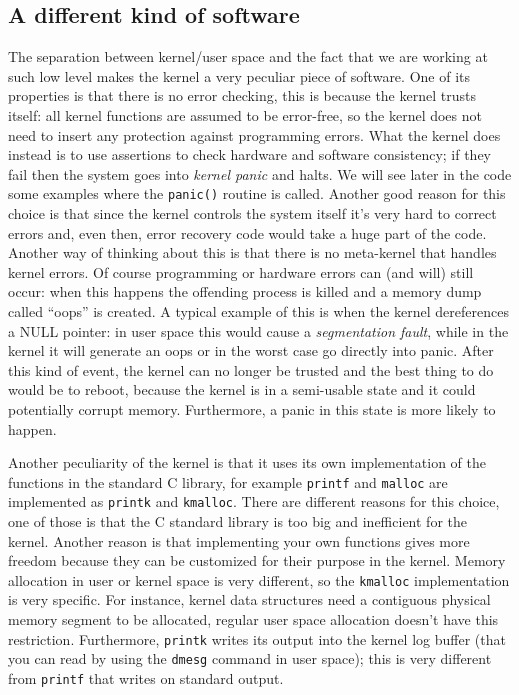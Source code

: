 \documentclass[10pt]{book}
\begin{document}
\subsection{A different kind of software} The separation between kernel/user space and the fact that we are working at such low level makes the kernel a very peculiar piece of software. One of its properties is that there is no error checking, this is because the kernel trusts itself: all kernel functions are assumed to be error-free, so the kernel does not need to insert any protection against programming errors\cite{cesati}. What the kernel does instead is to use assertions to check hardware and software consistency; if they fail then the system goes into \textit{kernel panic} and halts. We will see later in the code some examples where the \verb|panic()| routine is called. Another good reason for this choice is that since the kernel controls the system itself it's very hard to correct errors and, even then, error recovery code would take a huge part of the code. Another way of thinking about this is that there is no meta-kernel that handles kernel errors. Of course programming or hardware errors can (and will) still occur: when this happens the offending process is killed and a memory dump called ``oops'' is created. A typical example of this is when the kernel dereferences a NULL pointer: in user space this would cause a \textit{segmentation fault}, while in the kernel it will generate an oops or in the worst case go directly into panic. After this kind of event, the kernel can no longer be trusted and the best thing to do would be to reboot, because the kernel is in a semi-usable state and it could potentially corrupt memory. Furthermore, a panic in this state is more likely to happen. %

Another peculiarity of the kernel is that it uses its own implementation of the functions in the standard C library, for example \verb|printf| and \verb|malloc| are implemented as \verb|printk| and \verb|kmalloc|. There are different reasons for this choice, one of those is that the C standard library is too big and inefficient for the kernel. Another reason is that implementing your own functions gives more freedom because they can be customized for their purpose in the kernel. Memory allocation in user or kernel space is very different, so the \verb|kmalloc| implementation is very specific. For instance, kernel data structures need a contiguous physical memory segment to be allocated, regular user space allocation doesn't have this restriction. Furthermore, \verb|printk| writes its output into the kernel log buffer (that you can read by using the \verb|dmesg| command in user space); this is very different from \verb|printf| that writes on standard output.
\end{document}
